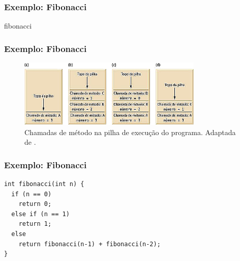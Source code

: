\documentclass[aspectratio=169]{beamer}
\begin{document}

\begin{frame}
\frametitle{Exemplo: Fibonacci}

\begin{algorithm}[H]
\caption{fibonacci} 
\label{fibonacci}
\end{algorithm}
\end{frame}


\begin{frame}
\frametitle{Exemplo: Fibonacci}

\begin{figure}[!h]
  \centering
  \includegraphics[width=250pt]{imgs/exemplo2_fibonacci_pilha_execucao.png}
  \caption{\footnotesize{Chamadas de método na pilha de execução do programa. Adaptada de .}}
  \label{fig_exemplo_fibonacci2}
\end{figure}
\end{frame}


\begin{frame}[fragile]
\frametitle{Exemplo: Fibonacci}
\begin{lstlisting}
int fibonacci(int n) {
  if (n == 0) 
    return 0;
  else if (n == 1)
    return 1;
  else
    return fibonacci(n-1) + fibonacci(n-2);
}
\end{lstlisting}
\end{frame}


\end{document}
